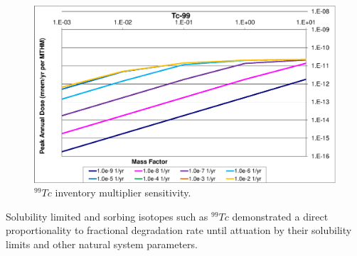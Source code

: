 \begin{figure}[ht!]
  \centering
  \includegraphics[width=\linewidth]{99TcMF.eps}
  \caption{$^{99}Tc$ inventory multiplier sensitivity.}
  \label{fig:WFDegTc99MF}
\end{figure}

Solubility limited and sorbing isotopes such as $^{99}Tc$ demonstrated a direct 
proportionality to fractional degradation rate until attuation by their 
solubility limits and other natural system parameters. 


